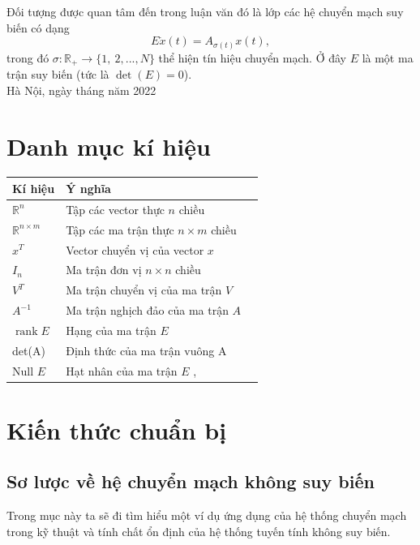 \documentclass[12pt,a4paper]{report}
\theoremstyle{definition}
\theoremstyle{definition}
\numberwithin{dl}{chapter}
\numberwithin{vd}{chapter}
\numberwithin{corollary}{chapter}
\numberwithin{lemma}{chapter}
\numberwithin{md}{chapter}
\numberwithin{dn}{chapter}
\numberwithin{cy}{chapter}
\numberwithin{nx}{chapter}
\begin{document}
Đối tượng được quan tâm đến trong luận văn đó là lớp các hệ chuyển mạch suy biến có dạng
%
\[
E \dot{x}(t) = A_{\sigma(t)} x(t), 
\]
%
trong đó $\sigma: \mathbb{R}_+ \longrightarrow \{1,\ 2, ..., N \}$ thể hiện tín hiệu chuyển mạch. Ở đây $E$ là một ma trận suy biến (tức là $\det(E)=0$).\\

\vskip 0.5cm
\qquad \qquad \qquad \qquad \qquad \qquad \qquad  Hà Nội, ngày  tháng  năm 2022

\newpage
{}

\chapter*{Danh mục kí hiệu}
	\begin{table}[!h]
			\begin{tabular}{lll}
			\hline 
			Kí hiệu  & Ý nghĩa \\ 
			\hline
                $\mathbb{R}^{n}$ &  Tập các vector thực $n$ chiều\\
			    $\mathbb{R}^{n \times m}$ &  Tập các ma trận thực $n \times m$ chiều\\
                $x^{T}$ & Vector chuyển vị của vector $x$\\
                $I_{n}$ & Ma trận đơn vị $n \times n$ chiều\\
                $V^{T}$ & Ma trận chuyển vị của ma trận $V$\\
                $A^{-1}$ & Ma trận nghịch đảo của ma trận $A$\\
                $\operatorname{rank} E$ & Hạng của ma trận $E$\\
			det(A)  &  Định thức của ma trận vuông A \\ 	
			Null $E$  & Hạt nhân của ma trận $E$ , \\
		\hline 
		\end{tabular} 
\end{table}

\chapter{Kiến thức chuẩn bị}\label{Chapter 1}

\section{Sơ lược về hệ chuyển mạch không suy biến}\label{Section 1.1}

Trong mục này ta sẽ đi tìm hiểu một ví dụ ứng dụng của hệ thống chuyển mạch trong
kỹ thuật và tính chất ổn định của hệ thống tuyến tính không suy biến.
\end{document}
